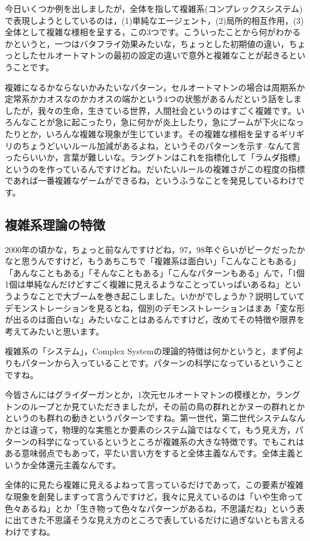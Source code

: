 \documentclass{ltjsbook}
\begin{document}
今日いくつか例を出しましたが，全体を指して複雑系(コンプレックスシステム)で表現しようとしているのは，(1)単純なエージェント，(2)局所的相互作用，(3)全体として複雑な様相を呈する，この3つです。こういったことから何がわかるかというと，一つはバタフライ効果みたいな，ちょっとした初期値の違い，ちょっとしたセルオートマトンの最初の設定の違いで意外と複雑なことが起きるということです。

複雑になるかならないかみたいなパターン，セルオートマトンの場合は周期系か定常系かカオスなのかカオスの端かという4つの状態があるんだという話をしましたが，我々の生命，生きている世界，人間社会というのはすごく複雑です。いろんなことが急に起こったり，急に何かが炎上したり，急にブームが下火になったりとか，いろんな複雑な現象が生じています。その複雑な様相を呈するギリギリのちょうどいいルール加減があるよね，というそのパターンを示す--なんて言ったらいいか，言葉が難しいな。ラングトンはこれを指標化して「ラムダ指標」というのを作っているんですけどね。だいたいルールの複雑さがこの程度の指標であれば一番複雑なゲームができるね，というふうなことを発見しているわけです。

\subsection{複雑系理論の特徴}
2000年の頃かな，ちょっと前なんですけどね，97，98年ぐらいがピークだったかなと思うんですけど，もうあちこちで「複雑系は面白い」「こんなこともある」「あんなこともある」「そんなこともある」「こんなパターンもある」んで，「1個1個は単純なんだけどすごく複雑に見えるようなことっていっぱいあるね」というようなことで大ブームを巻き起こしました。いかがでしょうか？説明していてデモンストレーションを見るとね，個別のデモンストレーションはまあ「変な形が出るのは面白いな」みたいなことはあるんですけど，改めてその特徴や限界を考えてみたいと思います。

複雑系の「システム」，Complex Systemの理論的特徴は何かというと，まず何よりもパターンから入っていることです。パターンの科学になっているということですね。

今皆さんにはグライダーガンとか，1次元セルオートマトンの模様とか，ラングトンのループとか見ていただきましたが，その前の鳥の群れとかヌーの群れとかというのも群れの動きというパターンですね。第一世代，第二世代システムなんかとは違って，物理的な実態とか要素のシステム論ではなくて，もう見え方，パターンの科学になっているというところが複雑系の大きな特徴です。でもこれはある意味弱点でもあって，平たい言い方をすると全体主義なんです。全体主義というか全体還元主義なんです。

全体的に見たら複雑に見えるよねって言っているだけであって，この要素が複雑な現象を創発しますって言うんですけど，我々に見えているのは「いや生命って色々あるね」とか「生き物って色々なパターンがあるね，不思議だね」という表に出てきた不思議そうな見え方のところで表しているだけに過ぎないとも言えるわけですね。
\end{document}
